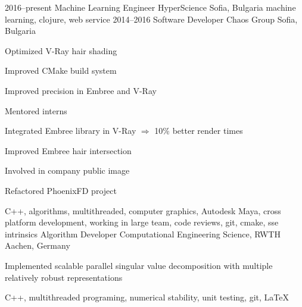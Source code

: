 \myjobb
{2016--present}
{Machine Learning Engineer}
{HyperScience}
{Sofia, Bulgaria}
{
}
{
}
{machine learning, clojure, web service}
\myjobb
{2014--2016}
{Software Developer}
{Chaos Group}
{Sofia, Bulgaria}
{
\item Optimized V-Ray hair shading
\item Improved CMake build system 
\item Improved precision in Embree and V-Ray
\item Mentored interns
}
{
\item Integrated Embree library in V-Ray $\Rightarrow$ 10\% better render times 
\item Improved Embree hair intersection 
\item Involved in company public image
\item Refactored PhoenixFD project
}
{C++, algorithms, multithreaded, computer graphics, Autodesk Maya, cross platform development, working in large team, code reviews, git, cmake, sse intrinsics}
{Algorithm Developer}
{Computational Engineering Science, RWTH}
{Aachen, Germany}
{ \item Implemented scalable parallel singular value decomposition with multiple relatively robust representations}
{C++, multithreaded programing, numerical stability, unit testing, git, \LaTeX}

